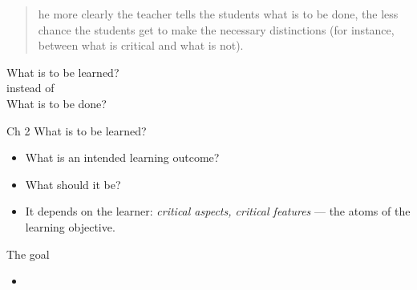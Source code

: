 \begin{frame}
  \begin{example}
    \blockcquote[p.~13]{NecessaryConditionsOfLearning}{%
      he more clearly the teacher tells the students what is to be 
      done, the less chance the students get to make the necessary distinctions 
      (for instance, between what is critical and what is not).%
    }
  \end{example}
\end{frame}

\begin{frame}
  \begin{center}
    What is to be learned?\\[1em]
    instead of\\[1em]
    What is to be done?
  \end{center}
\end{frame}

\begin{frame}
\end{frame}

\begin{frame}
  \begin{block}{Ch 2 What is to be learned?}
    \begin{itemize}
      \item What is an intended learning outcome?
      \item What should it be?
      \item It depends on the learner: \emph{critical aspects, critical 
        features} --- the atoms of the learning objective.
    \end{itemize}
  \end{block}

  \pause

  \begin{block}{The goal}
    \begin{itemize}
      \item {}
    \end{itemize}
  \end{block}
\end{frame}

